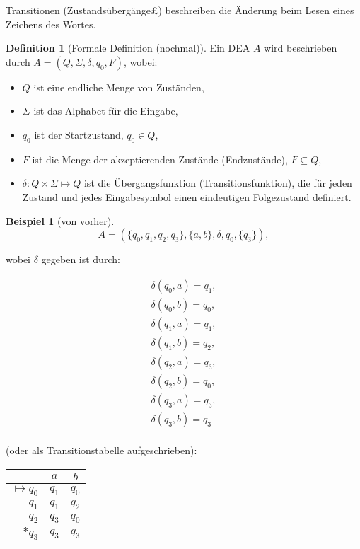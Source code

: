 \documentclass[11pt]{article} %
\theoremstyle{definition}
\newtheorem*{beispiel}{Beispiel}
\newtheorem{definition}{Definition}
\begin{document}
Transitionen (Zustandsübergänge£) beschreiben die Änderung beim Lesen eines Zeichens des Wortes.

\begin{definition}[Formale Definition (nochmal)]
Ein DEA $A$ wird beschrieben durch $A = (Q, \Sigma, \delta, q_0, F)$, wobei:
\begin{itemize}
\item $Q$ ist eine endliche Menge von Zuständen,
\item $\Sigma$ ist das Alphabet für die Eingabe,
\item $q_0$ ist der Startzustand, $q_0 \in Q$,
\item $F$ ist die Menge der akzeptierenden Zustände (Endzustände), $F \subseteq Q$,
\item $\delta: Q \times \Sigma \mapsto Q$ ist die Übergangsfunktion (Transitionsfunktion), die für jeden Zustand und jedes Eingabesymbol einen eindeutigen Folgezustand definiert.

\end{itemize}
\end{definition}

\begin{beispiel}[von vorher]
\[
A = \left( \{q_0, q_1, q_2, q_3\}, \{ a,b\}, \delta, q_0, \{q_3 \} \right),
\]

wobei $\delta$ gegeben ist durch:

\begin{eqnarray*}
\delta(q_0, a) = q_1, \\
\delta(q_0, b) = q_0, \\
\delta(q_1, a) = q_1, \\
\delta(q_1, b) = q_2, \\
\delta(q_2, a) = q_3, \\
\delta(q_2, b) = q_0, \\
\delta(q_3, a) = q_3, \\
\delta(q_3, b) = q_3 \\
\end{eqnarray*}

(oder als Transitionstabelle aufgeschrieben):

\begin{tabular}{r|cc}
 & $a$ & $b$ \\
\hline 
$\mapsto q_0$ & $q_1$ & $q_0$ \\
$q_1$ & $q_1$ & $q_2$ \\
$q_2$ & $q_3$ & $q_0$ \\
$*q_3$ & $q_3$ & $q_3$
\end{tabular}

\end{beispiel}
\end{document}
